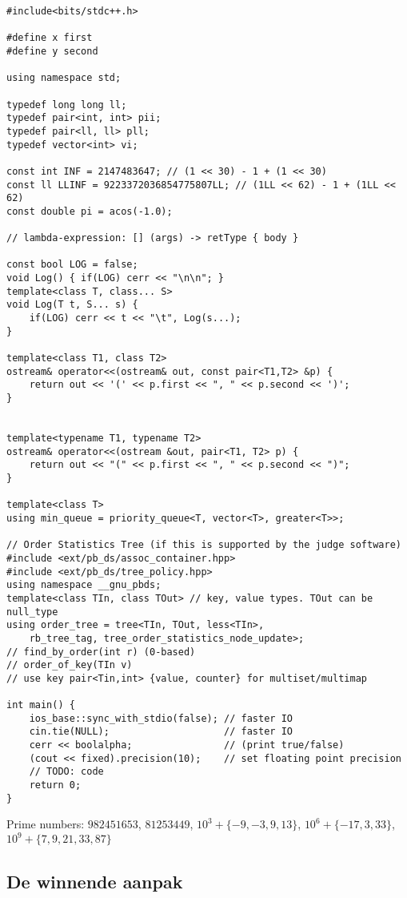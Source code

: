 \documentclass{article}
\begin{document}
\begin{lstlisting}
#include<bits/stdc++.h>

#define x first
#define y second

using namespace std;

typedef long long ll;
typedef pair<int, int> pii;
typedef pair<ll, ll> pll;
typedef vector<int> vi;

const int INF = 2147483647; // (1 << 30) - 1 + (1 << 30)
const ll LLINF = 9223372036854775807LL; // (1LL << 62) - 1 + (1LL << 62)
const double pi = acos(-1.0);

// lambda-expression: [] (args) -> retType { body }

const bool LOG = false;
void Log() { if(LOG) cerr << "\n\n"; }
template<class T, class... S>
void Log(T t, S... s) {
	if(LOG) cerr << t << "\t", Log(s...);
}

template<class T1, class T2>
ostream& operator<<(ostream& out, const pair<T1,T2> &p) {
	return out << '(' << p.first << ", " << p.second << ')';
}


template<typename T1, typename T2>
ostream& operator<<(ostream &out, pair<T1, T2> p) {
	return out << "(" << p.first << ", " << p.second << ")";
}

template<class T>
using min_queue = priority_queue<T, vector<T>, greater<T>>;

// Order Statistics Tree (if this is supported by the judge software)
#include <ext/pb_ds/assoc_container.hpp>
#include <ext/pb_ds/tree_policy.hpp>
using namespace __gnu_pbds;
template<class TIn, class TOut> // key, value types. TOut can be null_type
using order_tree = tree<TIn, TOut, less<TIn>,
	rb_tree_tag, tree_order_statistics_node_update>;
// find_by_order(int r) (0-based)
// order_of_key(TIn v)
// use key pair<Tin,int> {value, counter} for multiset/multimap

int main() {
	ios_base::sync_with_stdio(false); // faster IO
	cin.tie(NULL);                    // faster IO
	cerr << boolalpha;                // (print true/false)
	(cout << fixed).precision(10);    // set floating point precision
	// TODO: code
	return 0;
}

\end{lstlisting}

Prime numbers: $\mathit{982451653}$, $\mathit{81253449}$, $10^3 + \{-9,-3,9,13\}$, $10^6 + \{-17, 3, 33\}$, $10^9 + \{7,9,21,33,87\}$

\subsection{De winnende aanpak}
\end{document}
